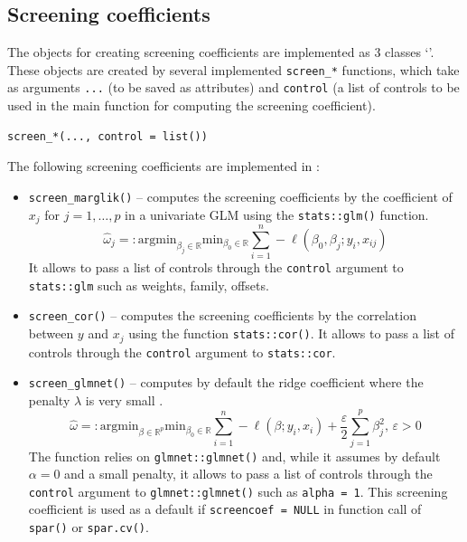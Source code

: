 \documentclass[
  article,
  nojss]{jss}
\newcommand{\class}[1]{`\code{#1}'}
\begin{document}
\subsection{Screening coefficients}\label{screening-coefficients}

The objects for creating screening coefficients are implemented as
3 classes \class{screencoef}. These objects are created by
several implemented \texttt{screen\_*} functions, which take as
arguments \texttt{...} (to be saved as attributes) and \texttt{control}
(a list of controls to be used in the main function for computing the
screening coefficient).

\begin{verbatim}
screen_*(..., control = list())
\end{verbatim}

The following screening coefficients are implemented in :

\begin{itemize}
\item
  \texttt{screen\_marglik()} -- computes the screening coefficients by
  the coefficient of \(x_j\) for \(j =1,\dots,p\) in a univariate GLM
  using the \texttt{stats::glm()} function. \[
  \hat\omega_j=:\text{argmin}_{\beta_j\in \mathbb{R}}\text{min}_{{\beta_0}\in\mathbb{R}}\sum_{i=1}^n -\ell(\beta_0,\beta_j;y_i,x_{ij})
  \] It allows to pass a list of controls through the \texttt{control}
  argument to \texttt{stats::glm} such as weights, family, offsets.
\item
  \texttt{screen\_cor()} -- computes the screening coefficients by the
  correlation between \(y\) and \(x_j\) using the function
  \texttt{stats::cor()}. It allows to pass a list of controls through
  the \texttt{control} argument to \texttt{stats::cor}.
\item
  \texttt{screen\_glmnet()} -- computes by default the ridge coefficient
  where the penalty \(\lambda\) is very small \citep[see][ for
  clarification]{parzer2024glms}. \[
  \hat\omega=: \text{argmin}_{\beta\in \mathbb{R}^p}\text{min}_{{\beta_0}\in\mathbb{R}}\sum_{i=1}^n -\ell(\beta;y_i,x_i) + \frac{\varepsilon}{2}\sum_{j=1}^p{\beta}_j^2, \, \varepsilon > 0
  \] The function relies on \texttt{glmnet::glmnet()} and, while it
  assumes by default \(\alpha = 0\) and a small penalty, it allows to
  pass a list of controls through the \texttt{control} argument to
  \texttt{glmnet::glmnet()} such as \texttt{alpha\ =\ 1}. This screening
  coefficient is used as a default if \texttt{screencoef\ =\ NULL} in
  function call of \texttt{spar()} or \texttt{spar.cv()}.
\end{itemize}
\end{document}
